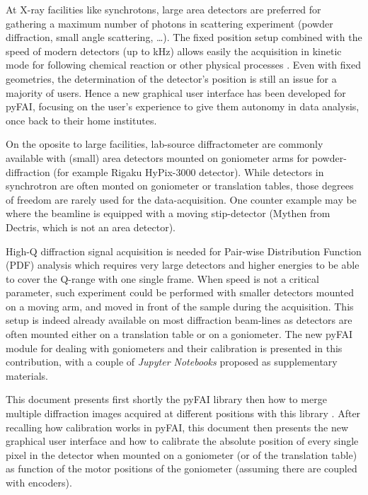 \documentclass[preprint, pdf]{iucr}              %
\begin{document}
At X-ray facilities like synchrotons, large area detectors are
preferred for gathering a maximum number of photons in
scattering experiment (powder diffraction, small angle
scattering, \ldots).
The fixed position setup combined with the speed of modern detectors (up
to kHz) allows easily the acquisition in kinetic mode for following chemical
reaction or other physical processes \cite{id15, id31}.
Even with fixed geometries, the determination of the detector's position is
still an issue for a majority of users.
Hence a new graphical user interface has been developed for pyFAI, focusing
on the user's experience to give them autonomy in data analysis, once back to
their home institutes.


On the oposite to large facilities, lab-source diffractometer are commonly
available with (small) area detectors mounted on goniometer arms for
powder-diffraction (for example Rigaku HyPix-3000 detector).
While detectors in synchrotron are often monted on goniometer or translation
tables, those degrees of freedom are rarely used for the data-acquisition.
One counter example may be \cite{Gao:kc5032} where the beamline is equipped with
a moving stip-detector (Mythen from Dectris, which is not an area detector).




High-Q diffraction signal acquisition is needed \cite{Chupas:wf5000} for
Pair-wise Distribution Function (PDF) analysis which requires very large
detectors and higher energies to be able to cover the Q-range with one single frame.
When speed is not a critical parameter, such experiment could be performed
with smaller detectors mounted on a moving arm, and moved in front of
the sample during the acquisition.
This setup is indeed already available on most diffraction beam-lines as
detectors are often mounted either on a translation table or on a
goniometer.
The new pyFAI module for dealing with goniometers and their calibration is
presented in this contribution, with a couple of \textit{Jupyter Notebooks}
\cite{ipython} proposed as supplementary materials.

This document presents first shortly the pyFAI library \cite{fv5028} then how to
merge multiple diffraction images acquired at different positions with this
library \cite{PyFAI_PDJ}.
After recalling how calibration works in pyFAI, this document then
presents the new graphical user interface and how to
calibrate the absolute position of every single pixel in the detector when
mounted on a goniometer (or of the translation table) as function of the  motor
positions of the goniometer (assuming there are coupled with encoders).
\end{document}
